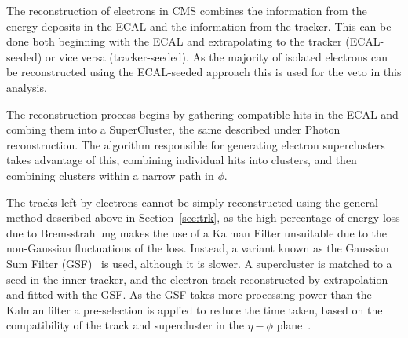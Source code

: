 The reconstruction of electrons in CMS combines the information from the energy deposits in the ECAL and the information from the tracker. This can be done both beginning with the ECAL and extrapolating to the tracker (ECAL-seeded) or vice versa (tracker-seeded). As the majority of isolated electrons can be reconstructed using the ECAL-seeded approach this is used for the veto in this analysis. 

The reconstruction process begins by gathering compatible hits in the ECAL and combing them into a SuperCluster, the same described under Photon reconstruction. The algorithm responsible for generating electron superclusters takes advantage of this, combining individual hits into clusters, and then combining clusters within a narrow path in $\phi$. 

The tracks left by electrons cannot be simply reconstructed using the general method described above in Section~\ref{sec:trk}, as the high percentage of energy loss due to Bremsstrahlung makes the use of a Kalman Filter unsuitable due to the non-Gaussian fluctuations of the loss. Instead, a variant known as the Gaussian Sum Filter (GSF)~\cite{gsf} is used, although it is slower. A supercluster is matched to a seed in the inner tracker, and the electron track reconstructed by extrapolation and fitted with the GSF.  As the GSF takes more processing power than the Kalman filter a pre-selection is applied to reduce the time taken, based on the compatibility of the track and supercluster in the $\eta - \phi$ plane~\cite{EGM-10-004}.



